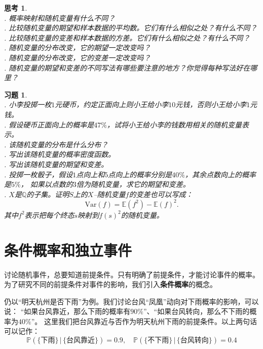 \documentclass[12pt,UTF8]{ctexbook}
\newtheorem{sk}{思考}[section]
\newtheorem{xt}{习题}[section]
\begin{document}
\begin{sk}
    \mbox{} \\
    . 概率映射和随机变量有什么不同？ \\
    . 比较随机变量的期望和样本数据的平均数。它们有什么相似之处？有什么不同？\\
    . 比较随机变量的变差和样本数据的方差。它们有什么相似之处？有什么不同？\\
    . 随机变量的分布改变，它的期望一定改变吗？\\
    . 随机变量的分布改变，它的变差一定改变吗？ \\
    . 随机变量的期望和变差的不同写法有哪些要注意的地方？你觉得每种写法好在哪里？   
\end{sk}

\begin{xt}
    \mbox{} \\
    . 小李投掷一枚$1$元硬币，约定正面向上则小王给小李$10$元钱，否则小王给小李$1$元钱。\\
    . 假设硬币正面向上的概率是$47\%$，试将小王给小李的钱数用相关的随机变量表示。\\
    . 该随机变量的分布是什么分布？    \\
    . 写出该随机变量的概率密度函数。\\
    . 写出该随机变量的期望和变差。\\
    . 投掷一枚骰子，假设$1$点向上和$5$点向上的概率分别是$40\%$，其余点数向上的概率是$5\%$，
    如果以点数的$3$倍为随机变量，求它的期望和变差。\\
    . $X$是$\mathbb{Q}$的子集。证明$S$上的$X$–随机变量$f$的变差也可以写成：
    $$ \mathrm{Var}(f)  = \mathbb{E}(f^2) - \mathbb{E}(f)^2.$$  
    \indent \hspace{1em}  其中$f^2$表示把每个终态$s$映射到$f(s)^2$的随机变量。
\end{xt}

\section{条件概率和独立事件}
讨论随机事件，总要知道前提条件。只有明确了前提条件，才能讨论事件的概率。
为了研究不同的前提条件对事件的影响，我们引入\textbf{条件概率}的概念。

仍以“明天杭州是否下雨”为例。我们讨论台风“凤凰”动向对下雨概率的影响，可以说：
“如果台风靠近，那么下雨的概率有$90\%$”、“如果台风转向，那么不下雨的概率为$40\%$”。
这里我们把台风靠近与否作为明天杭州下雨的前提条件。以上两句话可以记作：
$$ \mathbb{P} (\{\mbox{下雨}\} \, | \, \{\mbox{台风靠近}\}) = 0.9, \quad \mathbb{P} (\{\mbox{不下雨}\} \, | \, \{\mbox{台风转向}\}) = 0.4$$
\end{document}

